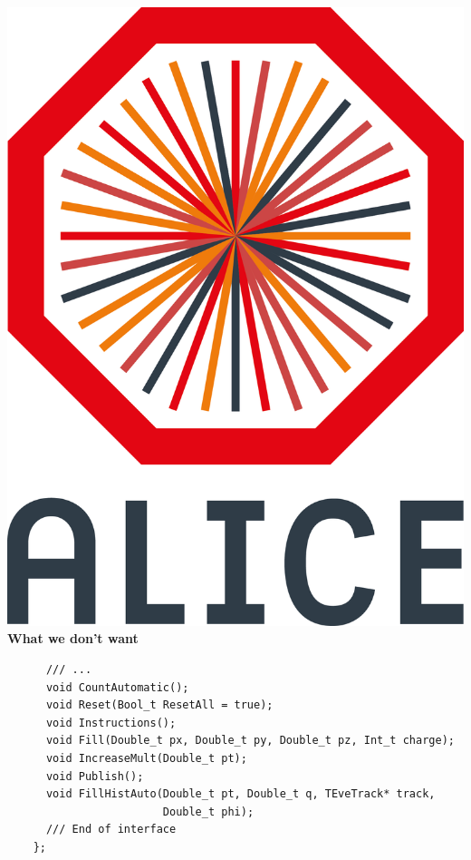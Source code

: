 \documentclass[aspectratio=1610,14pt,dvipsnames]{beamer}
\begin{document}
\begin{frame}[fragile]{\includegraphics[height=0.07\textheight]{2012-Jul-04-4_Color_Logo_CB.png} \hspace{0.2cm}\textbf{What we don't want}}
  \begin{verbatim}
      /// ...
      void CountAutomatic();
      void Reset(Bool_t ResetAll = true);
      void Instructions();
      void Fill(Double_t px, Double_t py, Double_t pz, Int_t charge);
      void IncreaseMult(Double_t pt);
      void Publish();
      void FillHistAuto(Double_t pt, Double_t q, TEveTrack* track,
                        Double_t phi);
      /// End of interface
    };
  \end{verbatim}
\end{frame}
\end{document}
